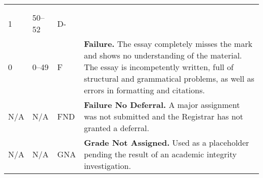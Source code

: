\documentclass[12pt]{article}
\begin{document}
{\begin{tabular}{|l|l|l|l|}
& & & \\
& & & \\
\multirow{3}{*}{1} & \multirow{3}{*}{50--52} & \multirow{3}{*}{D-} & \\
& & & \\
& & & \\
\hline
\multirow{4}{*}{0} & \multirow{4}{*}{0--49} & \multirow{4}{*}{F} & \multirow{4}{4in}{\textbf{Failure.} The essay completely misses the mark and shows no understanding of the material. The essay is incompetently written, full of structural and grammatical problems, as well as errors in formatting and citations.}\\
& & & \\
& & & \\
& & & \\
\hline
\multirow{2}{*}{N/A} & \multirow{2}{*}{N/A} & \multirow{2}{*}{FND} & \multirow{2}{4in}{\textbf{Failure No Deferral.} A major assignment was not submitted and the Registrar has not granted a deferral.}\\
& & & \\
\hline
\multirow{2}{*}{N/A} & \multirow{2}{*}{N/A} & \multirow{2}{*}{GNA} & \multirow{2}{4in}{\textbf{Grade Not Assigned.} Used as a placeholder pending the result of an academic integrity investigation.}\\
& & & \\
\hline
\end{tabular}
}
\end{document}
